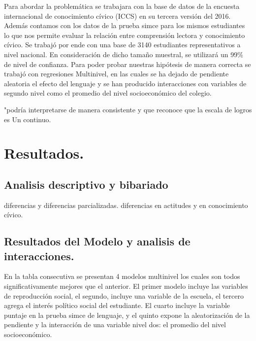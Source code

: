 \documentclass[
]{article}
\begin{document}
Para abordar la problemática se trabajara con la base de datos de la
encuesta internacional de conocimiento cívico (ICCS) en su tercera
versión del 2016. Además contamos con los datos de la prueba simce para
los mismos estudiantes lo que nos permite evaluar la relación entre
comprensión lectora y conocimiento cívico. Se trabajó por ende con una
base de 3140 estudiantes representativos a nivel nacional. En
consideración de dicho tamaño muestral, se utilizará un 99\% de nivel de
confianza. Para poder probar nuestras hipótesis de manera correcta se
trabajó con regresiones Multinivel, en las cuales se ha dejado de
pendiente aleatoria el efecto del lenguaje y se han producido
interacciones con variables de segundo nivel como el promedio del nivel
socioeconómico del colegio.

"podría interpretarse de manera consistente y que reconoce que la escala
de logros es Un continuo.

\hypertarget{resultados.}{%
\section{Resultados.}\label{resultados.}}

\hypertarget{analisis-descriptivo-y-bibariado}{%
\subsection{Analisis descriptivo y
bibariado}\label{analisis-descriptivo-y-bibariado}}

diferencias y diferencias parcializadas. diferencias en actitudes y en
conocimiento cívico.

\hypertarget{resultados-del-modelo-y-analisis-de-interacciones.}{%
\subsection{Resultados del Modelo y analisis de
interacciones.}\label{resultados-del-modelo-y-analisis-de-interacciones.}}

En la tabla consecutiva se presentan 4 modelos multinivel los cuales son
todos significativamente mejores que el anterior. El primer modelo
incluye las variables de reproducción social, el segundo, incluye una
variable de la escuela, el tercero agrega el interés político social del
estudiante. El cuarto incluye la variable puntaje en la prueba simce de
lenguaje, y el quinto expone la aleatorización de la pendiente y la
interacción de una variable nivel dos: el promedio del nivel
socioeconómico.
\end{document}
